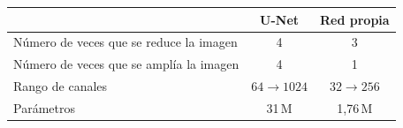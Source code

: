 \begin{tabular}{lcc}
\toprule
\textbf{} & \textbf{U-Net} & \textbf{Red propia} \\
\midrule
Número de veces que se reduce la imagen & 4 & 3 \\
Número de veces que se amplía la imagen & 4 & 1 \\
Rango de canales & $64 \to \num{1024}$ & $32 \to 256$ \\
Parámetros & 31\,M & 1,76\,M \\
\bottomrule
\end{tabular}
